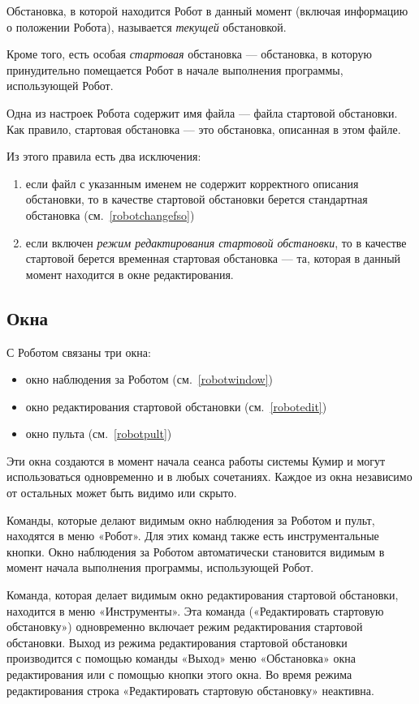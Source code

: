 Обстановка, в которой находится Робот в данный момент (включая информацию о положении Робота), называется \emph{текущей} обстановкой.

Кроме того, есть особая \emph{стартовая} обстановка --- обстановка, в которую принудительно помещается Робот в начале выполнения программы, использующей Робот.

Одна из настроек Робота содержит имя файла --- файла стартовой обстановки. Как правило, стартовая обстановка --- это обстановка, описанная в этом файле.

Из этого правила есть два исключения:
\begin{enumerate}
\item если файл с указанным именем не содержит корректного описания обстановки, то в качестве стартовой обстановки берется стандартная обстановка (см.~\ref{robotchangefso})
\item если включен \emph{режим редактирования стартовой обстановки}, то в качестве стартовой берется временная стартовая обстановка --- та, которая в данный момент находится в окне редактирования.
\end{enumerate}


\subsection{Окна}

С Роботом связаны три окна:
\begin{itemize}
\item окно наблюдения за Роботом (см.~\ref{robotwindow})
\item окно редактирования стартовой обстановки (см.~\ref{robotedit})
\item окно пульта (см.~\ref{robotpult})
\end{itemize}

Эти окна создаются в момент начала сеанса работы системы Кумир и могут использоваться одновременно и в любых сочетаниях. Каждое из окна независимо от остальных может быть видимо или скрыто.

Команды, которые делают видимым окно наблюдения за Роботом и пульт, находятся в меню «Робот». Для этих команд также есть инструментальные кнопки. Окно наблюдения за Роботом автоматически становится видимым в момент начала выполнения программы, использующей Робот.

Команда, которая делает видимым окно редактирования стартовой обстановки, находится в меню «Инструменты». Эта команда («Редактировать стартовую обстановку») одновременно включает режим редактирования стартовой обстановки. Выход из режима редактирования стартовой обстановки производится с помощью команды «Выход» меню «Обстановка» окна редактирования или с помощью кнопки этого окна. Во время режима редактирования строка «Редактировать стартовую обстановку» неактивна.

